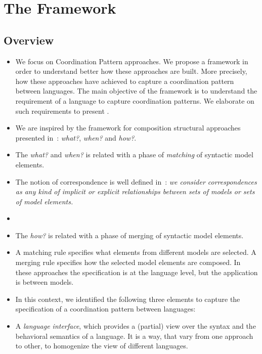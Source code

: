\section{The Framework}
\subsection{Overview}
\begin{itemize}
	\item We focus on Coordination Pattern approaches. We propose a framework in order to understand better how these approaches are built. More precisely, how these approaches have achieved to capture a coordination pattern between languages. The main objective of the framework is to understand the requirement of a language to capture coordination patterns. We elaborate on such requirements to present \bcool. 

	\item We are inspired by the framework for composition structural approaches presented in~\cite{framecompoas,kompose}: \emph{what?}, \emph{when?} and \emph{how?}.
	
	\item The \emph{what?} and \emph{when?} is related with a phase of \emph{matching} of syntactic model elements.
	
	\item The notion of correspondence is well defined in~\cite{clavreulmodelcompo}: \emph{we consider correspondences as any kind of implicit or explicit relationships between sets of models or sets of model elements.} 
	
	\item {}
	
	\item The \emph{how?} is related with a phase of merging of syntactic model elements. 
	
	\item A matching rule specifies what elements from different models are selected. A merging rule specifies how the selected model elements are composed. In these approaches the specification is at the language level, but the application is between models.
	
	\item In this context, we identified the following three elements to capture the specification of a coordination pattern between languages: 
		
	\item A \emph{language interface}, which provides a (partial) view over the syntax and the behavioral semantics of a language. It is a way, that vary from one approach to other, to homogenize the view of different languages.
		

\end{itemize}
